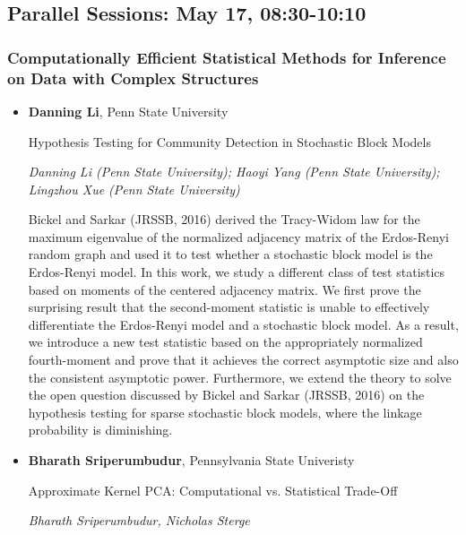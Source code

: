 \subsection*{Parallel Sessions: May 17, 08:30-10:10}

\subsubsection*{Computationally Efficient Statistical Methods for Inference on Data with Complex Structures}

\begin{itemize}
\item \textbf{Danning Li}, Penn State University

Hypothesis Testing for Community Detection in Stochastic Block Models

\emph{\footnotesize Danning Li (Penn State University); Haoyi Yang (Penn State University); Lingzhou Xue  (Penn State University)}

Bickel and Sarkar (JRSSB, 2016) derived the Tracy-Widom law for the maximum eigenvalue of the normalized adjacency matrix of the Erdos-Renyi random graph and used it to test whether a stochastic block model is the Erdos-Renyi model. In this work, we study a different class of test statistics based on moments of the centered adjacency matrix. We first prove the surprising result that the second-moment statistic is unable to effectively differentiate the Erdos-Renyi model and a stochastic block model. As a result, we introduce a new test statistic based on the appropriately normalized fourth-moment and prove that it achieves the correct asymptotic size and also the consistent asymptotic power. Furthermore, we extend the theory to solve the open question discussed by Bickel and Sarkar (JRSSB, 2016) on the hypothesis testing for sparse stochastic block models, where the linkage probability is diminishing.

\item \textbf{Bharath Sriperumbudur}, Pennsylvania State Univeristy

Approximate Kernel PCA: Computational vs. Statistical Trade-Off

\emph{\footnotesize Bharath Sriperumbudur, Nicholas Sterge}


\end{itemize}
